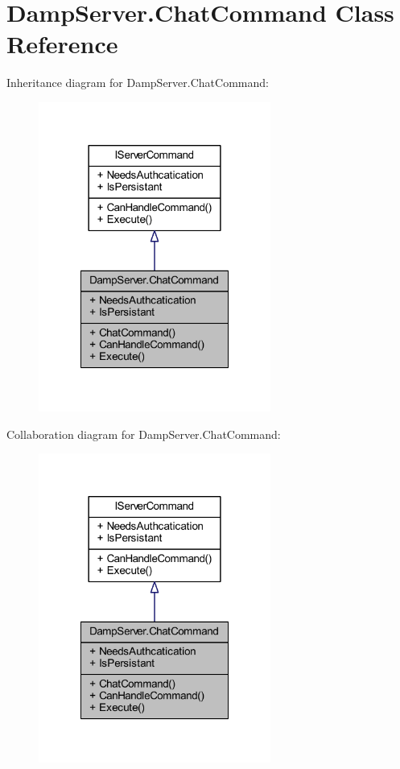 \hypertarget{class_damp_server_1_1_chat_command}{\section{Damp\-Server.\-Chat\-Command Class Reference}
\label{class_damp_server_1_1_chat_command}
}


Inheritance diagram for Damp\-Server.\-Chat\-Command\-:\nopagebreak
\begin{figure}[H]
\begin{center}
\leavevmode
\includegraphics[width=216pt]{class_damp_server_1_1_chat_command__inherit__graph}
\end{center}
\end{figure}


Collaboration diagram for Damp\-Server.\-Chat\-Command\-:\nopagebreak
\begin{figure}[H]
\begin{center}
\leavevmode
\includegraphics[width=216pt]{class_damp_server_1_1_chat_command__coll__graph}
\end{center}
\end{figure}

